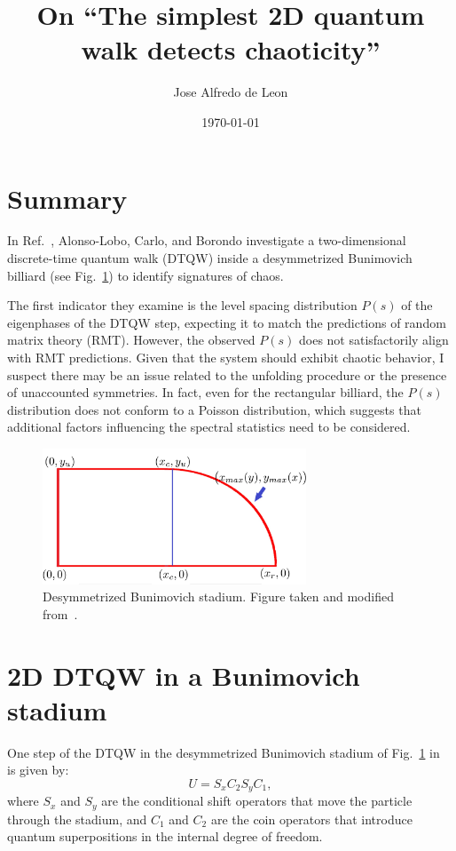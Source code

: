 \documentclass[10pt,letterpaper]{article} %
\title{On ``The simplest 2D quantum walk detects chaoticity''}
\author{Jose Alfredo de Leon}
\date{\today}
\begin{document}
\maketitle

\section{Summary}
In Ref.~\cite{alonso-lobo_2025_simplest}, Alonso-Lobo, Carlo, and Borondo 
investigate a two-dimensional discrete-time quantum walk (DTQW) inside a 
desymmetrized Bunimovich billiard (see Fig.~\ref{fig:bunimovich}) to identify 
signatures of chaos. 

The first indicator they examine is the level spacing distribution \( P(s) \) 
of the eigenphases of the DTQW step, expecting it to match the predictions of 
random matrix theory (RMT). However, the observed \( P(s) \) does 
not satisfactorily align with RMT predictions. Given that the system should 
exhibit chaotic behavior, I suspect there may be an issue related to the 
unfolding procedure or the presence of unaccounted symmetries. In fact, even 
for the rectangular billiard, the \( P(s) \) distribution does not conform to 
a Poisson distribution, which suggests that additional factors influencing the 
spectral statistics need to be considered.


\begin{figure}
\centering
\includegraphics[width=0.7\textwidth]{bunimovich.pdf}
\caption{Desymmetrized Bunimovich stadium.
Figure taken and modified from~\cite{alonso-lobo_2025_simplest}.}
\label{fig:bunimovich}
\end{figure}

\section*{2D DTQW in a Bunimovich stadium}
One step of the DTQW in the desymmetrized Bunimovich stadium of 
Fig.~\ref{fig:bunimovich} in~\cite{alonso-lobo_2025_simplest} is given by:
\begin{equation}
    U = S_x C_2 S_y C_1,
\end{equation}
where \( S_x \) and \( S_y \) are the conditional shift operators that move the 
particle through the stadium, and \( C_1 \) and \( C_2 \) are the coin operators 
that introduce quantum superpositions in the internal degree of freedom. 
\end{document}
